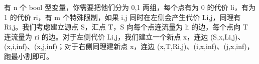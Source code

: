 {}有 \markdownRendererDollarSign{}n\markdownRendererDollarSign{} 个 \markdownRendererDollarSign{}bool\markdownRendererDollarSign{} 型变量，你需要把他们分为 \markdownRendererDollarSign{}0,1\markdownRendererDollarSign{} 两组，每个点有为 \markdownRendererDollarSign{}0\markdownRendererDollarSign{} 的代价 \markdownRendererDollarSign{}l\markdownRendererUnderscore{}i\markdownRendererDollarSign{}，有为 \markdownRendererDollarSign{}1\markdownRendererDollarSign{} 的代价 \markdownRendererDollarSign{}r\markdownRendererUnderscore{}i\markdownRendererDollarSign{}，有 \markdownRendererDollarSign{}m\markdownRendererDollarSign{} 个特殊限制，如果 \markdownRendererDollarSign{}i,j\markdownRendererDollarSign{} 同时在左侧会产生代价 \markdownRendererDollarSign{}L\markdownRendererUnderscore{}\markdownRendererLeftBrace{}i,j\markdownRendererRightBrace{}\markdownRendererDollarSign{}，同理有 \markdownRendererDollarSign{}R\markdownRendererUnderscore{}\markdownRendererLeftBrace{}i,j\markdownRendererRightBrace{}\markdownRendererDollarSign{}。我们考虑建立源点 \markdownRendererDollarSign{}S\markdownRendererDollarSign{}，汇点 \markdownRendererDollarSign{}T\markdownRendererDollarSign{}，\markdownRendererDollarSign{}S\markdownRendererDollarSign{} 向每个点连流量为 \markdownRendererDollarSign{}l\markdownRendererUnderscore{}i\markdownRendererDollarSign{} 的边，每个点向 \markdownRendererDollarSign{}T\markdownRendererDollarSign{} 连流量为 \markdownRendererDollarSign{}r\markdownRendererUnderscore{}i\markdownRendererDollarSign{} 的边。对于左侧代价 \markdownRendererDollarSign{}L\markdownRendererUnderscore{}\markdownRendererLeftBrace{}i,j\markdownRendererRightBrace{}\markdownRendererDollarSign{}，我们建立一个新点 \markdownRendererDollarSign{}x\markdownRendererDollarSign{}，连边 \markdownRendererDollarSign{}(S,x,L\markdownRendererUnderscore{}\markdownRendererLeftBrace{}i,j\markdownRendererRightBrace{})\markdownRendererDollarSign{}、\markdownRendererDollarSign{}(x,i,\markdownRendererBackslash{}inf)\markdownRendererDollarSign{}、\markdownRendererDollarSign{}(x,j,\markdownRendererBackslash{}inf)\markdownRendererDollarSign{}；对于右侧同理建新点 \markdownRendererDollarSign{}x\markdownRendererDollarSign{}，连边 \markdownRendererDollarSign{}(x,T,R\markdownRendererUnderscore{}\markdownRendererLeftBrace{}i,j\markdownRendererRightBrace{})\markdownRendererDollarSign{}、\markdownRendererDollarSign{}(i,x,\markdownRendererBackslash{}inf)\markdownRendererDollarSign{}、\markdownRendererDollarSign{}(j,x,\markdownRendererBackslash{}inf)\markdownRendererDollarSign{}，跑最小割即可。\markdownRendererInterblockSeparator
{}
